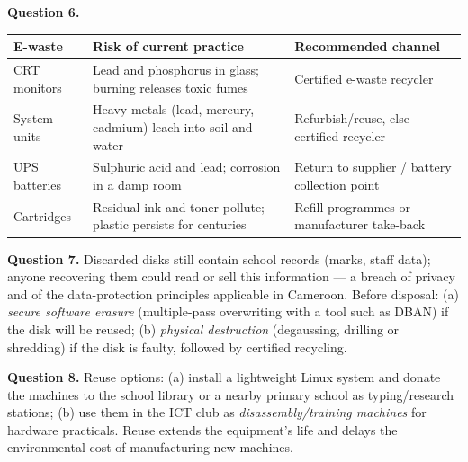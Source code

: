 \documentclass[11pt]{article}
\begin{document}
\textbf{Question 6.}
\begin{center}
\begin{tabularx}{\linewidth}{|l|X|X|}
\hline
\rowcolor{popblueL} \textbf{E-waste} & \textbf{Risk of current practice} & \textbf{Recommended channel} \\
\hline
CRT monitors & Lead and phosphorus in glass; burning releases toxic fumes & Certified e-waste recycler \\
\hline
System units & Heavy metals (lead, mercury, cadmium) leach into soil and water & Refurbish/reuse, else certified recycler \\
\hline
UPS batteries & Sulphuric acid and lead; corrosion in a damp room & Return to supplier / battery collection point \\
\hline
Cartridges & Residual ink and toner pollute; plastic persists for centuries & Refill programmes or manufacturer take-back \\
\hline
\end{tabularx}
\end{center}

\textbf{Question 7.} Discarded disks still contain school records (marks, staff data); anyone recovering them could read or sell this information --- a breach of privacy and of the data-protection principles applicable in Cameroon. Before disposal: (a) \emph{secure software erasure} (multiple-pass overwriting with a tool such as DBAN) if the disk will be reused; (b) \emph{physical destruction} (degaussing, drilling or shredding) if the disk is faulty, followed by certified recycling.

\textbf{Question 8.} Reuse options: (a) install a lightweight Linux system and donate the machines to the school library or a nearby primary school as typing/research stations; (b) use them in the ICT club as \emph{disassembly/training machines} for hardware practicals. Reuse extends the equipment's life and delays the environmental cost of manufacturing new machines.
\end{document}
